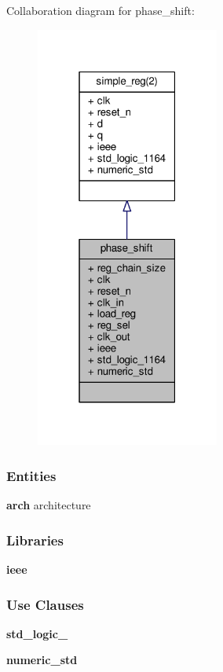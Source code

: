 Collaboration diagram for phase\+\_\+shift\+:\nopagebreak
\begin{figure}[H]
\begin{center}
\leavevmode
\includegraphics[width=171pt]{d8/d36/classphase__shift__coll__graph}
\end{center}
\end{figure}
\subsubsection*{Entities}
\begin{DoxyCompactItemize}
\item 
{\bf arch} architecture
\end{DoxyCompactItemize}
\subsubsection*{Libraries}
 \begin{DoxyCompactItemize}
\item 
{\bf ieee} 
\end{DoxyCompactItemize}
\subsubsection*{Use Clauses}
 \begin{DoxyCompactItemize}
\item 
{\bf std\+\_\+logic\+\_}   
\item 
{\bf numeric\+\_\+std}   
\end{DoxyCompactItemize}
